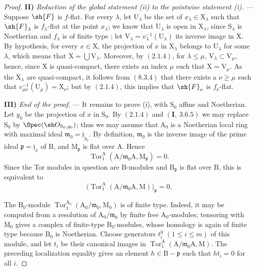 \begin{proof}
\medskip
\noindent\textbf{II)} \emph{Reduction of the global statement (ii) to the pointwise statement (i).} --- Suppose $\sh{F}$ is $f$-flat. For every $\lambda$, let $\mathrm{U}_\lambda$ be the set of $x_\lambda\in\mathrm{X}_\lambda$ such that $\sh{F}_\lambda$ is $f_\lambda$-flat at the point $x_\lambda$; we know that $\mathrm{U}_\lambda$ is open in $\mathrm{X}_\lambda$, since $\mathrm{S}_\lambda$ is Noetherian and $f_\lambda$ is of finite type ; let $\mathrm{V}_\lambda=v_\lambda^{-1}(\mathrm{U}_\lambda)$ its inverse image in $\mathrm{X}$. By hypothesis, for every $x\in\mathrm{X}$, the projection of $x$ in $\mathrm{X}_\lambda$ belongs to $\mathrm{U}_\lambda$ for some $\lambda$, which means that $\mathrm{X}=\bigcup\mathrm{V}_\lambda$. Moreover, by $(2.1.4)$, for $\lambda\leqslant\mu$, $\mathrm{V}_\lambda\subset\mathrm{V}_\mu$, hence, since $\mathrm{X}$ is quasi-compact, there exists an index $\mu$ such that $\mathrm{X}=\mathrm{V}_\mu$. As the $\mathrm{X}_\lambda$ are quasi-compact, it follows from $(8.3.4)$ that there exists a $\nu\geqslant\mu$ such that $v_{\mu\nu}^{-1}(\mathrm{U}_\mu)=\mathrm{X}_\nu$; but by $(2.1.4)$, this implies that $\sh{F}_\nu$ is $f_\nu$-flat.

\medskip
\noindent\textbf{III)} \emph{End of the proof.} --- It remains to prove
(i), with $\mathrm S_0$ affine and Noetherian. Let $y_0$ be the
projection of $x$ in $\mathrm S_0$. By $(2.1.4)$ and
$(\mathbf I,~3.6.5)$ we may replace $\mathrm S_0$ by
$\Spec(\sh O_{\mathrm S_0,y_0})$; thus we may assume that
$\mathrm A_0$ is a Noetherian local ring with maximal ideal
$\mathfrak m_0=\mathfrak j_{y_0}$. By definition,
$\mathfrak m_0$ is the inverse image of the prime ideal
$\mathfrak p=\mathfrak j_x$ of $\mathrm B$, and
$\mathrm M_{\mathfrak p}$ is flat over $\mathrm A$. Hence
\[
  \operatorname{Tor}_1^\mathrm A
  (\mathrm A/\mathfrak m_0\mathrm A,\mathrm M_{\mathfrak p})=0.
\]
Since the Tor modules in question are $\mathrm B$-modules and
$\mathrm B_{\mathfrak p}$ is flat over $\mathrm B$, this is equivalent
to
\[
  \bigl(\operatorname{Tor}_1^\mathrm A
  (\mathrm A/\mathfrak m_0\mathrm A,\mathrm M)\bigr)_{\mathfrak p}=0.
\]

The $\mathrm B_0$-module
$\operatorname{Tor}_1^{\mathrm A_0}
(\mathrm A_0/\mathfrak m_0,\mathrm M_0)$ is of finite type. Indeed, it
may be computed from a resolution of $\mathrm A_0/\mathfrak m_0$ by
finite free $\mathrm A_0$-modules; tensoring with $\mathrm M_0$ gives a
complex of finite-type $\mathrm B_0$-modules, whose homology is again
of finite type because $\mathrm B_0$ is Noetherian. Choose generators
$t_i^0$ $(1\leqslant i\leqslant m)$ of this module, and let $t_i$ be
their canonical images in
$\operatorname{Tor}_1^\mathrm A
(\mathrm A/\mathfrak m_0\mathrm A,\mathrm M)$. The preceding
localization equality gives an element
$h\in\mathrm B-\mathfrak p$ such that $ht_i=0$ for all $i$.


\end{proof}
